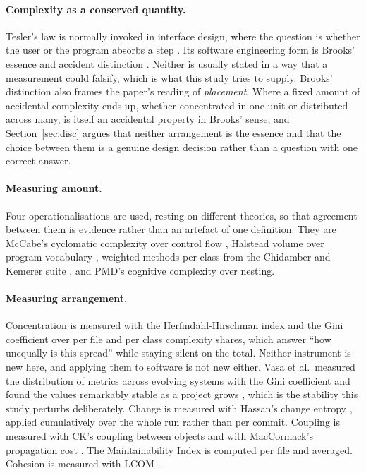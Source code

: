 \documentclass[11pt,a4paper]{article}
\begin{document}
\paragraph{Complexity as a conserved quantity.} Tesler's law is normally
invoked in interface design, where the question is whether the user or the
program absorbs a step \cite{tesler1984, norman2010}. Its software engineering form is
Brooks' essence and accident distinction \cite{brooks1987}. Neither is usually
stated in a way that a measurement could falsify, which is what this study
tries to supply. Brooks' distinction also frames the paper's reading of
\emph{placement}. Where a fixed amount of accidental complexity ends up, whether
concentrated in one unit or distributed across many, is itself an accidental
property in Brooks' sense, and Section~\ref{sec:disc} argues that neither
arrangement is the essence and that the choice between them is a genuine design
decision rather than a question with one correct answer.

\paragraph{Measuring amount.} Four operationalisations are used, resting on
different theories, so that agreement between them is evidence rather than an
artefact of one definition. They are McCabe's cyclomatic complexity over control flow
\cite{mccabe1976}, Halstead volume over program vocabulary \cite{halstead1977},
weighted methods per class from the Chidamber and Kemerer suite
\cite{ck1994}, and PMD's cognitive complexity over nesting.

\paragraph{Measuring arrangement.} Concentration is measured with the
Herfindahl-Hirschman index \cite{hirschman1964} and the Gini coefficient
\cite{ceriani2012} over per file and per class
complexity shares, which answer ``how unequally is this spread'' while staying
silent on the total. Neither instrument is new here, and applying them to
software is not new either. Vasa et al.\ measured the distribution of metrics
across evolving systems with the Gini coefficient and found the values
remarkably stable as a project grows \cite{vasa2009}, which is the stability
this study perturbs deliberately. Change is measured with Hassan's change entropy
\cite{hassan2009}, applied cumulatively over the whole run rather than per
commit. Coupling is measured with CK's coupling between objects \cite{ck1994}
and with MacCormack's propagation cost \cite{maccormack2006}. The
Maintainability Index \cite{oman1992} is computed per file and averaged.
Cohesion is measured with LCOM \cite{ck1994, hs1996}.
\end{document}
